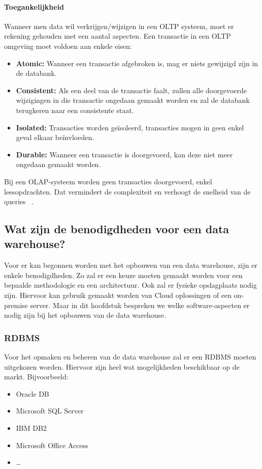 \paragraph{Toegankelijkheid}
Wanneer men data wil verkrijgen/wijzigen in een OLTP systeem, moet er rekening gehouden met een aantal aspecten. Een transactie in een OLTP omgeving moet voldoen aan enkele eisen:
\begin{itemize}
	\item \textbf{Atomic:} Wanneer een transactie afgebroken is, mag er niets gewijzigd zijn in de databank.
	\item \textbf{Consistent:} Als een deel van de transactie faalt, zullen alle doorgevoerde wijzigingen in die transactie ongedaan gemaakt worden en zal de databank terugkeren naar een consistente staat.
	\item \textbf{Isolated:} Transacties worden geïsoleerd, transacties mogen in geen enkel geval elkaar beïnvloeden.
	\item \textbf{Durable:} Wanneer een transactie is doorgevoerd, kan deze niet meer ongedaan gemaakt worden.
\end{itemize}  

Bij een OLAP-systeem worden geen transacties doorgevoerd, enkel leesopdrachten. Dat vermindert de complexiteit en verhoogt de snelheid van de queries ~\autocite{Satyanarayana2010}. 

\subsection{Wat zijn de benodigdheden voor een data warehouse?}
Voor er kan begonnen worden met het opbouwen van een data warehouse, zijn er enkele benodigdheden. Zo zal er een keuze moeten gemaakt worden voor een bepaalde methodologie en een architectuur. Ook zal er fysieke opslagplaats nodig zijn. Hiervoor kan gebruik gemaakt worden van Cloud oplossingen of een on-premise server. Maar in dit hoofdstuk bespreken we welke software-aspecten er nodig zijn bij het opbouwen van de data warehouse.

\subsubsection{RDBMS}
Voor het opmaken en beheren van de data warehouse zal er een RDBMS moeten uitgekozen worden. Hiervoor zijn heel wat mogelijkheden beschikbaar op de markt. Bijvoorbeeld: 

\begin{itemize}
	\item Oracle DB
	\item Microsoft SQL Server
	\item IBM DB2
	\item Microsoft Office Access
	\item \ldots
\end{itemize} 

